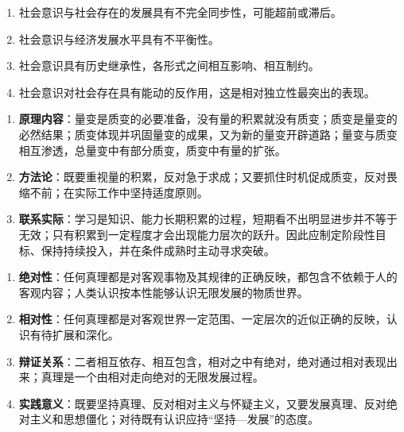 \yaodian
\begin{enumerate}[label=(\arabic*),leftmargin=2.2em,itemsep=2pt,topsep=2pt]
\item 社会意识与社会存在的发展具有不完全同步性，可能超前或滞后。
\item 社会意识与经济发展水平具有不平衡性。
\item 社会意识具有历史继承性，各形式之间相互影响、相互制约。
\item 社会意识对社会存在具有能动的反作用，这是相对独立性最突出的表现。
\end{enumerate}


\yaodian
\begin{enumerate}[label=(\arabic*),leftmargin=2.2em,itemsep=2pt,topsep=2pt]
\item \textbf{原理内容}：量变是质变的必要准备，没有量的积累就没有质变；质变是量变的必然结果；质变体现并巩固量变的成果，又为新的量变开辟道路；量变与质变相互渗透，总量变中有部分质变，质变中有量的扩张。
\item \textbf{方法论}：既要重视量的积累，反对急于求成；又要抓住时机促成质变，反对畏缩不前；在实际工作中坚持适度原则。
\item \textbf{联系实际}：学习是知识、能力长期积累的过程，短期看不出明显进步并不等于无效；只有积累到一定程度才会出现能力层次的跃升。因此应制定阶段性目标、保持持续投入，并在条件成熟时主动寻求突破。
\end{enumerate}

\yaodian
\begin{enumerate}[label=(\arabic*),leftmargin=2.2em,itemsep=2pt,topsep=2pt]
\item \textbf{绝对性}：任何真理都是对客观事物及其规律的正确反映，都包含不依赖于人的客观内容；人类认识按本性能够认识无限发展的物质世界。
\item \textbf{相对性}：任何真理都是对客观世界一定范围、一定层次的近似正确的反映，认识有待扩展和深化。
\item \textbf{辩证关系}：二者相互依存、相互包含，相对之中有绝对，绝对通过相对表现出来；真理是一个由相对走向绝对的无限发展过程。
\item \textbf{实践意义}：既要坚持真理、反对相对主义与怀疑主义，又要发展真理、反对绝对主义和思想僵化；对待既有认识应持“坚持—发展”的态度。
\end{enumerate}

